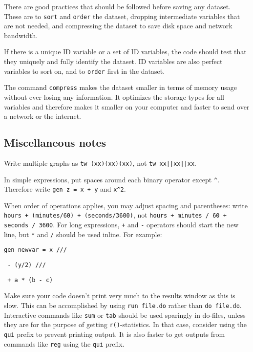 There are good practices that should be followed before saving any dataset.
These are to \texttt{sort} and \texttt{order} the dataset,
dropping intermediate variables that are not needed,
and compressing the dataset to save disk space and network bandwidth.

If there is a unique ID variable or a set of ID variables,
the code should test that they uniquely and
fully identify the dataset.
ID variables are also perfect variables to sort on,
and to \texttt{order} first in the dataset.

The command \texttt{compress} makes the dataset smaller in terms of memory usage
without ever losing any information.
It optimizes the storage types for all variables
and therefore makes it smaller on your computer
and faster to send over a network or the internet.


\subsection*{Miscellaneous notes}

Write multiple graphs as \texttt{tw (xx)(xx)(xx)}, not \texttt{tw xx||xx||xx}.

\bigskip\noindent In simple expressions, put spaces around each binary operator except \texttt{\^}.
Therefore write \texttt{gen z = x + y} and \texttt{x\^}\texttt{2}.

\bigskip\noindent When order of operations applies, you may adjust spacing and parentheses: write
\texttt{hours + (minutes/60) + (seconds/3600)}, not \texttt{hours + minutes / 60 + seconds / 3600}.
For long expressions, \texttt{+} and \texttt{-} operators should start the new line,
but \texttt{*} and \texttt{/} should be used inline. For example:

\texttt{gen newvar =   x ///}

\texttt{             - (y/2) ///}

\texttt{             + a * (b - c)}

\bigskip\noindent  Make sure your code doesn't print very much to the results window as this is slow.
This can be accomplished by using \texttt{run file.do} rather than \texttt{do file.do}.
Interactive commands like \texttt{sum} or \texttt{tab} should be used sparingly in do-files,
unless they are for the purpose of getting \texttt{r()}-statistics.
In that case, consider using the \texttt{qui} prefix to prevent printing output.
It is also faster to get outputs from commands like \texttt{reg} using the \texttt{qui} prefix.

\mainmatter
